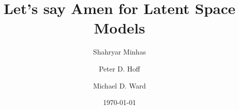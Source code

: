 \documentclass[12pt,onesided]{amsart}
\title{Let's say Amen for Latent Space Models}
\author[Minhas]{Shahryar Minhas}
\author[Hoff]{Peter D. Hoff}
\author[Ward]{Michael D. Ward}
\date{\today}
\begin{document}
\maketitle\thispagestyle{empty}

\begin{quote}
\small{\singlespacing{}}
\end{quote}

\newpage\setcounter{page}{1} 






\newpage

\newpage

% 

% 
\newpage
\end{document}
